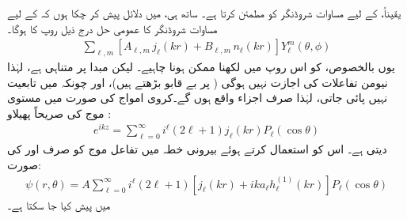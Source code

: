 یقیناً،  کے لیے مساوات شروڈنگر کو  مطمئن کرتا ہے۔ ساتھ ہی، میں دلائل پیش کر چکا ہوں کہ  کے لیے مساوات شروڈنگر کا عمومی حل درج ذیل روپ کا ہوگا۔
\begin{align*}
	\sum_{\ell, m}\left[A_{\ell, m}\,j_{\ell}(kr)+B_{\ell, m}\,n_{\ell}(kr)\right]Y_{\ell}^m(\theta, \phi)
\end{align*}
یوں بالخصوص،  کو اس روپ میں لکھنا ممکن ہونا چاہیے۔ لیکن مبدا پر  متناہی ہے، لہٰذا نیومن تفاعلات کی اجازت نہیں ہوگی ( پر  بے قابو بڑھتے ہیں)، اور چونکہ  میں تابعیت  نہیں پائی جاتی، لہٰذا صرف  اجزاء واقع ہوں گے۔کروی امواج کی صورت میں مستوی موج کی صریحاً پھیلاو :
\begin{align}\label{مساوات_بکھراو_کلیہ_ریلے}
	e^{ikz} = \sum_{\ell=0}^{\infty}i^{\ell}(2\ell+1)j_{\ell}(kr)P_{\ell}(\cos\theta)
\end{align}
 دیتی ہے۔ اس کو استعمال کرتے ہوئے بیرونی خطہ میں تفاعل موج کو صرف  اور  کی صورت:
\begin{align}
	\psi(r, \theta) = A\sum_{\ell=0}^{\infty}i^{\ell}(2\ell+1)\left[j_{\ell}(kr)+ika_{\ell}h_{\ell}^{(1)}(kr)\right]P_{\ell}(\cos\theta)
\end{align}
 میں پیش کیا جا سکتا ہے۔

